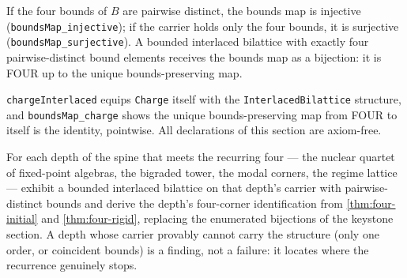 \begin{theorem}\label{thm:four-rigid}\leanok{}
If the four bounds of $B$ are pairwise distinct, the bounds map is injective
(\texttt{boundsMap\_injective}); if the carrier holds only the four bounds, it
is surjective (\texttt{boundsMap\_surjective}). A bounded interlaced bilattice
with exactly four pairwise-distinct bound elements receives the bounds map as
a bijection: it is FOUR up to the unique bounds-preserving map.
\end{theorem}

\begin{proposition}\label{thm:charge-interlaced}\leanok{}
\texttt{chargeInterlaced} equips \texttt{Charge} itself with the
\texttt{InterlacedBilattice} structure, and \texttt{boundsMap\_charge} shows
the unique bounds-preserving map from FOUR to itself is the identity,
pointwise. All declarations of this section are axiom-free.
\end{proposition}

\begin{theorem}\label{thm:depth-earns-four}\notready{}
For each depth of the spine that meets the recurring four --- the nuclear
quartet of fixed-point algebras, the bigraded tower, the modal corners, the
regime lattice --- exhibit a bounded interlaced bilattice on that depth's
carrier with pairwise-distinct bounds and derive the depth's four-corner
identification from \ref{thm:four-initial} and \ref{thm:four-rigid}, replacing
the enumerated bijections of the keystone section. A depth whose carrier
provably cannot carry the structure (only one order, or coincident bounds) is
a finding, not a failure: it locates where the recurrence genuinely stops.
\end{theorem}
